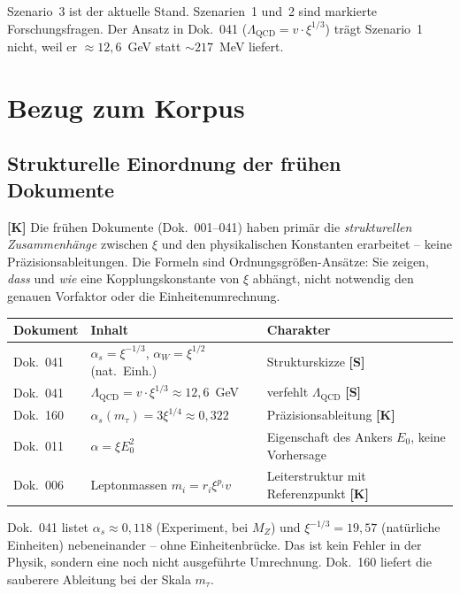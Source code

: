 Szenario~3 ist der aktuelle Stand. Szenarien~1 und~2 sind markierte
Forschungsfragen. Der Ansatz in Dok.~041 ($\Lambda_{\mathrm{QCD}} = v
\cdot \xi^{1/3}$) trägt Szenario~1 nicht, weil er $\approx 12{,}6$~GeV
statt $\sim 217$~MeV liefert.

\section{Bezug zum Korpus}

\subsection{Strukturelle Einordnung der frühen Dokumente}

\textbf{[K]} Die frühen Dokumente (Dok.~001--041) haben primär die
\emph{strukturellen Zusammenhänge} zwischen $\xi$ und den physikalischen
Konstanten erarbeitet -- keine Präzisionsableitungen. Die Formeln sind
Ordnungsgrößen-Ansätze: Sie zeigen, \emph{dass} und \emph{wie} eine
Kopplungskonstante von $\xi$ abhängt, nicht notwendig den genauen
Vorfaktor oder die Einheitenumrechnung.

\begin{center}
\begin{tabular}{lll}
\toprule
Dokument & Inhalt & Charakter \\
\midrule
Dok.~041 & $\alpha_s = \xi^{-1/3}$, $\alpha_W = \xi^{1/2}$ (nat.~Einh.)
  & Strukturskizze \textbf{[S]} \\
Dok.~041 & $\Lambda_{\mathrm{QCD}} = v \cdot \xi^{1/3} \approx 12{,}6$~GeV
  & verfehlt $\Lambda_{\mathrm{QCD}}$ \textbf{[S]} \\
Dok.~160 & $\alpha_s(m_\tau) = 3\xi^{1/4} \approx 0{,}322$
  & Präzisionsableitung \textbf{[K]} \\
Dok.~011 & $\alpha = \xi E_0^2$
  & Eigenschaft des Ankers $E_0$, keine Vorhersage \\
Dok.~006 & Leptonmassen $m_i = r_i\xi^{p_i}v$
  & Leiterstruktur mit Referenzpunkt \textbf{[K]} \\
\bottomrule
\end{tabular}
\end{center}

Dok.~041 listet $\alpha_s \approx 0{,}118$ (Experiment, bei $M_Z$) und
$\xi^{-1/3} = 19{,}57$ (natürliche Einheiten) nebeneinander -- ohne
Einheitenbrücke. Das ist kein Fehler in der Physik, sondern eine noch
nicht ausgeführte Umrechnung. Dok.~160 liefert die sauberere Ableitung
bei der Skala $m_\tau$.

